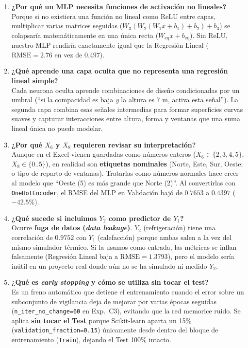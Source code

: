\documentclass[11pt,a4paper]{article}
\begin{document}
\begin{enumerate}[leftmargin=1.4em,itemsep=7pt]
    \item \textbf{¿Por qué un MLP necesita funciones de activación no lineales?}\\
    Porque si no existiera una función no lineal como ReLU entre capas, multiplicar varias matrices seguidas ($W_3(W_2(W_1 x + b_1) + b_2) + b_3$) se colapsaría matemáticamente en una única recta ($W_{\text{eq}} x + b_{\text{eq}}$). Sin ReLU, nuestro MLP rendiría exactamente igual que la Regresión Lineal ($\text{RMSE} = 2.76$ en vez de $0.497$).

    \item \textbf{¿Qué aprende una capa oculta que no representa una regresión lineal simple?}\\
    Cada neurona oculta aprende combinaciones de diseño condicionadas por un umbral (``si la compacidad es baja \textit{y} la altura es 7 m, activa esta señal''). La segunda capa combina esas señales intermedias para formar superficies curvas suaves y capturar interacciones entre altura, forma y ventanas que una suma lineal única no puede modelar.

    \item \textbf{¿Por qué $X_6$ y $X_8$ requieren revisar su interpretación?}\\
    Aunque en el Excel vienen guardadas como números enteros ($X_6 \in \{2,3,4,5\}$, $X_8 \in \{0..5\}$), en realidad son \textbf{etiquetas nominales} (Norte, Este, Sur, Oeste; o tipo de reparto de ventanas). Tratarlas como números normales hace creer al modelo que ``Oeste (5) es más grande que Norte (2)''. Al convertirlas con \texttt{OneHotEncoder}, el RMSE del MLP en Validación bajó de $0.7653$ a $0.4397$ ($-42.5\%$).

    \item \textbf{¿Qué sucede si incluimos $Y_2$ como predictor de $Y_1$?}\\
    Ocurre \textbf{fuga de datos (\textit{data leakage})}. $Y_2$ (refrigeración) tiene una correlación de $0.9752$ con $Y_1$ (calefacción) porque ambas salen a la vez del mismo simulador térmico. Si la usamos como entrada, las métricas se inflan falsamente (Regresión Lineal baja a $\text{RMSE}=1.3793$), pero el modelo sería inútil en un proyecto real donde aún no se ha simulado ni medido $Y_2$.

    \item \textbf{¿Qué es \textit{early stopping} y cómo se utiliza sin tocar el test?}\\
    Es un freno automático que detiene el entrenamiento cuando el error sobre un subconjunto de vigilancia deja de mejorar por varias épocas seguidas (\texttt{n\_iter\_no\_change=60} en Exp.~C3), evitando que la red memorice ruido. Se aplica \textbf{sin tocar el Test} porque Scikit-learn aparta un 15\% (\texttt{validation\_fraction=0.15}) únicamente desde dentro del bloque de entrenamiento (\texttt{Train}), dejando el Test 100\% intacto.


\end{enumerate}
\end{document}
